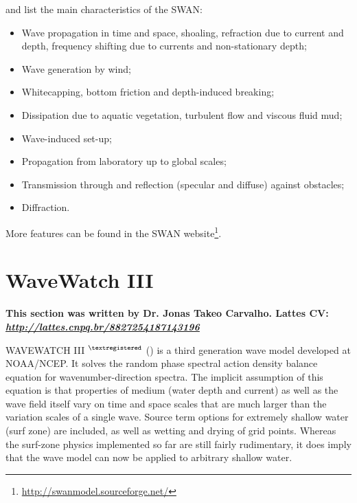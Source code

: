  \textcite{Dasilva2013} and \textcite{Booij1999,Booij1996} list the main characteristics of the SWAN:
\bigskip

\begin{itemize}
\item Wave propagation in time and space, shoaling, refraction due to current and depth, frequency shifting due to currents and non-stationary depth;
\item Wave generation by wind;
\item Whitecapping, bottom friction and depth-induced breaking;
\item Dissipation due to aquatic vegetation, turbulent flow and viscous fluid mud;
\item Wave-induced set-up;
\item Propagation from laboratory up to global scales;
\item Transmission through and reflection (specular and diffuse) against obstacles;
\item Diffraction.
\end{itemize}
\bigskip

More features can be found in the SWAN website\textcolor{bleu_cite}{\textit{}\footnote{\textcolor{bleu_cite}{\href{http://swanmodel.sourceforge.net/}{http://swanmodel.sourceforge.net/}}}}.



\section{WaveWatch III}\label{ww3secao}
\bigskip

 \textbf{This section was written by Dr. Jonas Takeo Carvalho.  \newline Lattes CV: \textit{\textcolor{bleu_cite}{\href{http://lattes.cnpq.br/8827254187143196}{http://lattes.cnpq.br/8827254187143196}}}} 
\bigskip

 WAVEWATCH III $^{\tiny{\textregistered}}$ (\cite{Tolman1997,Tolman1999,Tolman2009,Tolman2014,WW32016}) is a third generation wave model developed at NOAA/NCEP.  
It solves the random phase spectral action density balance equation for wavenumber-direction spectra. The implicit assumption of this equation is that 
properties of medium (water depth and current) as well as the wave field itself vary on time and space scales that are much larger than the variation 
scales of a single wave. Source term options for extremely shallow water (surf zone) are included, as well as wetting and drying of grid points. 
Whereas the surf-zone physics implemented so far are still fairly rudimentary, it does imply that the wave model can now be applied to arbitrary
shallow water. 
\bigskip

